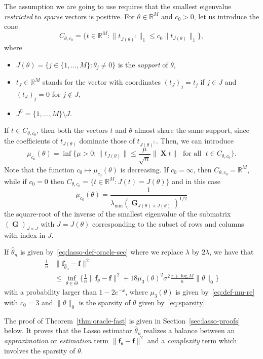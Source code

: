 \documentclass[
	fontsize=11pt, %
	twoside=false, %
	numbers=noenddot, %
]{kaobook}
\DeclareMathOperator{\bG}{{\boldsymbol G}}
\DeclareMathOperator{\bX}{{\boldsymbol X}}
\renewcommand{\bf}{{\boldsymbol f}}
\newcommand{\R}{\mathbb R}
\newcommand{\wh}{\widehat}
\newcommand{\norm}[1]{\| #1 \|}
\begin{document}
The assumption we are going to use requires that the smallest eigenvalue \emph{restricted} to \emph{sparse} vectors is positive.
For $\theta \in \R^M$ and $c_0 > 0$, let us introduce the cone
\begin{equation}
	\label{eq:def-cone-C}
	C_{\theta, c_0} = \big\{ t \in \R^M : \norm{t_{J(\theta)^\complement}}_1 
	\leq c_0 \norm{t_{J(\theta)}}_1 \big\},
\end{equation}
where
\begin{itemize}
	\item $J(\theta) = \{ j \in \{1, \ldots, M\} : \theta_j \neq 0 \}$ is the 
	\emph{support} of $\theta$,
	\item $t_J \in \R^M$ stands for the vector with coordinates $(t_J)_j = t_j$ if $j \in J$ and $(t_J)_j = 0$ for $j \notin J$,
	\item $J^\complement = \{ 1, \ldots, M \} \setminus J$.
\end{itemize}
If $t \in C_{\theta, c_0}$, then both the vectors $t$ and $\theta$ almost share the same support, since the coefficients of $t_{J(\theta)}$ dominate those of $t_{J(\theta)^\complement}$.
Then, we can introduce 
\begin{equation}
	\label{eq:def-mu-re}
	\mu_{c_0}(\theta) = \inf \Big\{ \mu > 0 : 
	\norm{t_{J(\theta)}} \leq \frac{\mu}{\sqrt n} \norm{\bX t} 
	\; \text{ for all } \; t \in C_{\theta, c_0} \Big\}.
\end{equation}
Note that the function $c_0 \mapsto \mu_{c_0}(\theta)$ is decreasing.
If $c_0 = \infty$, then $C_{\theta, c_0} = \R^M$, while if $c_0 = 0$ then
$C_{\theta, c_0} = \{ t \in \R^M : J(t) = J(\theta) \}$ and in this case
\begin{equation*}
	\mu_{c_0}(\theta) 
	= \frac{1}{\lambda_{\min}(\bG_{J(\theta) \times J(\theta)})^{1/2}}
\end{equation*}
the square-root of the inverse of the smallest eigenvalue of the submatrix $(\bG)_{J \times J}$ with $J = J(\theta)$ corresponding to the subset of rows and columns with index in $J$.
\begin{theorem}
	\label{thm:oracle-fast}
	If $\wh \theta_n$ is given by~\eqref{eq:lasso-def-oracle-sec} where we replace $\lambda$ by $2 \lambda$, we have that
	\begin{align*}
		\frac 1n &\norm{\bf_{\wh \theta_n} - \bf}^2 \\
		&\leq \inf_{\theta \in \Theta} 
		\bigg\{ \frac 1n  \norm{\bf_{\theta} - \bf}^2  + 18 \mu_3(\theta)^2 \sigma^2 \frac{x + \log M}{n} \norm{\theta}_0 \bigg\}
	\end{align*}
	with a probability larger than $1 - 2 e^{-x}$, where $\mu_3(\theta)$ is given by~\eqref{eq:def-mu-re} with $c_0 = 3$ and $\norm{\theta}_0$ is the sparsity of $\theta$ given by~\eqref{eq:sparsity}.
\end{theorem}
The proof of Theorem~\ref{thm:oracle-fast} is given in Section~\ref{sec:lasso-proofs} below.
It proves that the Lasso estimator $\wh \theta_n$ realizes a balance between an \emph{approximation} or \emph{estimation} term $\norm{\bf_{\theta} - \bf}^2$ and a \emph{complexity} term which involves  the sparsity of $\theta$.
\end{document}
